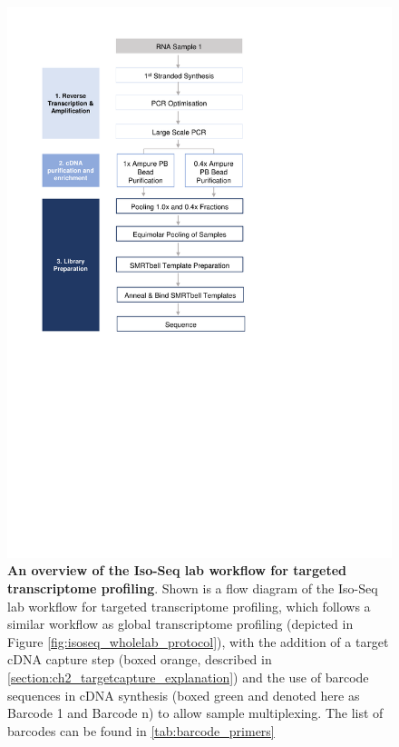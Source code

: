 \begin{figure}[]
	\begin{center}
		\includegraphics[page=2,trim={1cm 11cm 1cm 1cm},clip,scale = 0.8]{Figures/ProjectDevelopment_Figures.pdf}
	\end{center}
	\captionsetup{width=0.95\textwidth}
	\caption[Iso-Seq Lab workflow used for targeted transcriptome profiling]%
	{\textbf{An overview of the Iso-Seq lab workflow for targeted transcriptome profiling}. Shown is a flow diagram of the Iso-Seq lab workflow for targeted transcriptome profiling, which follows a similar workflow as global transcriptome profiling (depicted in Figure \ref{fig:isoseq_wholelab_protocol}), with the addition of a target cDNA capture step (boxed orange, described in \cref{section:ch2_targetcapture_explanation}) and the use of barcode sequences in cDNA synthesis (boxed green and denoted here as Barcode 1 and Barcode n) to allow sample multiplexing. The list of barcodes can be found in \cref{tab:barcode_primers}}
	\label{fig:isoseq_targetedlab_protocol}
\end{figure}

